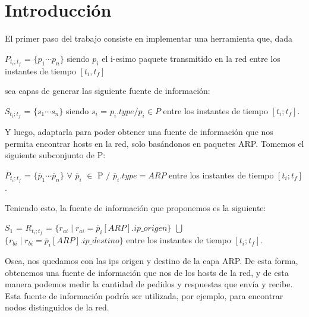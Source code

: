 \section{Introducci\'on}

El primer paso del trabajo consiste en implementar una herramienta que, dada 

\begin{center}
	$P_{t_i;t_f}$ = $\{p_1 \dotsb p_n\}$ siendo $p_i$ el i-esimo paquete transmitido en la red entre los instantes de tiempo $[t_i, t_f]$
\end{center}

sea capas de generar las siguiente fuente de información:

\begin{center}
	$S_{t_i;t_f}$ = $\{s_1 \dotsb s_n\}$ siendo $s_i$ = $p_i.type / p_i \in P$ entre los instantes de tiempo $[t_i; t_f ]$.
\end{center}

Y luego, adaptarla para poder obtener una fuente de información que nos permita encontrar hosts en la red, solo basándonos en paquetes ARP.
Tomemos el siguiente subconjunto de P: 

\begin{center}
	$\overline{P}_{t_i;t_f}$ = $\{\overline{p}_1 \dotsb \overline{p}_n\}$ $\forall$ $\overline{p}_i$ $\in$ P $/$ $\overline{p}_i.type = ARP$ entre los instantes de tiempo $[t_i; t_f ]$.
\end{center}

Teniendo esto, la fuente de información que proponemos es la siguiente:

\begin{center}
	$S_1$ = $R_{t_i;t_f}$ = $\{r_{ai} \mid r_{ai} = \overline{p}_i[ARP].ip\_origen \}$ $\bigcup$ $\{r_{bi} \mid r_{bi} = \overline{p}_i[ARP].ip\_destino \}$ entre los instantes de tiempo $[t_i; t_f ]$.
\end{center}

Osea, nos quedamos con las ips origen y destino de la capa ARP. De esta forma, obtenemos una fuente de información que nos de los hosts de la red, y de esta manera podemos medir la cantidad de pedidos y respuestas que envía y recibe. Esta fuente de información podría ser utilizada, por ejemplo, para encontrar nodos distinguidos de la red.


